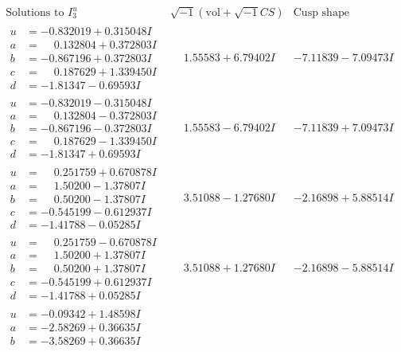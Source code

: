\documentclass[1p]{elsarticle_modified}
\theoremstyle{definition}
\newcommand{\I}{\sqrt{-1}}
\begin{document}
$$\begin{array}{c|c|c}  
\text{Solutions to }I^u_{3}& \I (\text{vol} + \sqrt{-1}CS) & \text{Cusp shape}\\
 \hline 
\begin{aligned}
u &= -0.832019 + 0.315048 I \\
a &= \phantom{-}0.132804 + 0.372803 I \\
b &= -0.867196 + 0.372803 I \\
c &= \phantom{-}0.187629 + 1.339450 I \\
d &= -1.81347 - 0.69593 I\end{aligned}
 & \phantom{-}1.55583 + 6.79402 I & -7.11839 - 7.09473 I \\ \hline\begin{aligned}
u &= -0.832019 - 0.315048 I \\
a &= \phantom{-}0.132804 - 0.372803 I \\
b &= -0.867196 - 0.372803 I \\
c &= \phantom{-}0.187629 - 1.339450 I \\
d &= -1.81347 + 0.69593 I\end{aligned}
 & \phantom{-}1.55583 - 6.79402 I & -7.11839 + 7.09473 I \\ \hline\begin{aligned}
u &= \phantom{-}0.251759 + 0.670878 I \\
a &= \phantom{-}1.50200 - 1.37807 I \\
b &= \phantom{-}0.50200 - 1.37807 I \\
c &= -0.545199 - 0.612937 I \\
d &= -1.41788 - 0.05285 I\end{aligned}
 & \phantom{-}3.51088 - 1.27680 I & -2.16898 + 5.88514 I \\ \hline\begin{aligned}
u &= \phantom{-}0.251759 - 0.670878 I \\
a &= \phantom{-}1.50200 + 1.37807 I \\
b &= \phantom{-}0.50200 + 1.37807 I \\
c &= -0.545199 + 0.612937 I \\
d &= -1.41788 + 0.05285 I\end{aligned}
 & \phantom{-}3.51088 + 1.27680 I & -2.16898 - 5.88514 I \\ \hline\begin{aligned}
u &= -0.09342 + 1.48598 I \\
a &= -2.58269 + 0.36635 I \\
b &= -3.58269 + 0.36635 I \\

\end{aligned}
\end{array}$$
\end{document}

